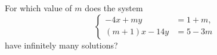 For which value of $m$ does the system \[\left\{\begin{aligned}
-4x+my &=1+m, \\
(m+1)x-14y &=5-3m
\end{aligned}\right.\]have infinitely many solutions?
